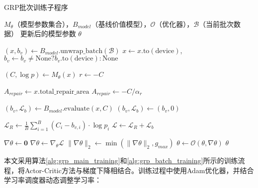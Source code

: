\documentclass[AutoFakeBold]{LZUThesis}
\begin{document}
\begin{algorithm}[H]
	\begin{algorithmic}[1]
		\caption{GRP批次训练子程序}
		\label{alg:grp_batch_training}
		\Require $M_{\theta}$（模型参数集合），$B_{model}$（基线价值模型），$\mathcal{O}$（优化器），$\mathcal{B}$（当前批次数据）
		\Ensure 更新后的模型参数 $\theta$

		\State $(x, b_v) \leftarrow B_{model}.\text{unwrap\_batch}(\mathcal{B})$ 
		\State $x \leftarrow x.\text{to}(\text{device})$, $b_v \leftarrow b_v \neq \text{None} ? b_v.\text{to}(\text{device}) : \text{None}$ 

		\State $(C, \log p) \leftarrow M_{\theta}(x)$ 
		\State $r \leftarrow -C$ 

			\State $A_{repair} \leftarrow x.\text{total\_repair\_area}$ 
		\Else
			\State $A_{repair} \leftarrow -C / \alpha_{r}$ 
		\EndIf

			\State $(b_v, \mathcal{L}_{b}) \leftarrow B_{model}.\text{evaluate}(x, C)$ 
		\Else
			\State $(b_v, \mathcal{L}_{b}) \leftarrow (b_v, 0)$ 
		\EndIf

		\State $\mathcal{L}_{R} \leftarrow \frac{1}{B}\sum_{i=1}^{B}(C_i - b_{v,i}) \cdot \log p_i$ 
		\State $\mathcal{L} \leftarrow \mathcal{L}_{R} + \mathcal{L}_{b}$ 

		\State $\nabla\theta \leftarrow \mathbf{0}$ 
		\State $\nabla\theta \leftarrow \nabla_{\theta}\mathcal{L}$ 
		\State $\|\nabla\theta\|_2 \leftarrow \min(\|\nabla\theta\|_2, g_{max})$ 
		\State $\theta \leftarrow \mathcal{O}(\theta, \nabla\theta)$ 
		\State \Return $\theta$ 
	\end{algorithmic}
\end{algorithm}

本文采用算法\ref{alg:grp_main_training}和\ref{alg:grp_batch_training}所示的训练流程，将Actor-Critic方法与梯度下降相结合。训练过程中使用Adam优化器，并结合学习率调度器动态调整学习率：
\end{document}
